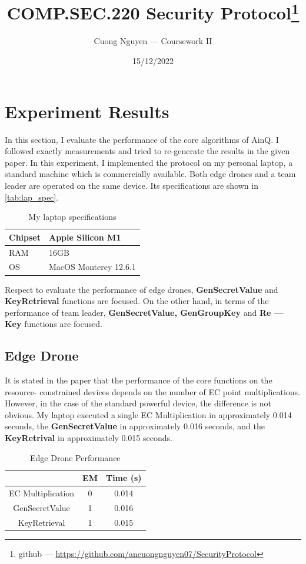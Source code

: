 \documentclass{article}
\title{COMP.SEC.220 Security Protocol\footnote{github --- \url{https://github.com/ancuongnguyen07/SecurityProtocol}}}
\author{Cuong Nguyen --- Coursework II}
\date{15/12/2022}
\begin{document}
    
\maketitle

\section{Experiment Results}
%
In this section, I evaluate the performance of the core algorithms of AinQ. I followed
exactly measurements and tried to re-generate the results in the given paper\cite{ainQ}.
In this experiment, I implemented the protocol on my personal laptop, a standard
machine which is commercially available. Both edge drones and a team leader
are operated on the same device.
Its specifications are shown in \autoref{tab:lap_spec}.

\begin{table}
    \centering
    \begin{tabular}{|l|l|}
        \hline
        Chipset & Apple Silicon M1 \\ \hline
        RAM & 16GB \\ \hline
        OS & MacOS Monterey 12.6.1 \\ \hline
    \end{tabular}
    \caption{My laptop specifications}\label{tab:lap_spec}
\end{table}

Respect to evaluate the performance of edge drones, \textbf{GenSecretValue} and
\textbf{KeyRetrieval} functions are focused. On the other hand, in terms of the performance
of team leader, \textbf{GenSecretValue, GenGroupKey} and \textbf{Re --- Key} functions
are focused.

\subsection{Edge Drone}
%
It is stated in the paper that the performance of the core functions on the resource-
constrained devices depends on the number of EC point multiplications\cite{ainQ}.
However, in the case of the standard powerful device, the difference is not obvious.
My laptop executed a single EC Multiplication in approximately 0.014 seconds, the
\textbf{GenSecretValue} in approximately 0.016 seconds, and the \textbf{KeyRetrival}
in approximately 0.015 seconds.

\begin{table}
    \centering
    \begin{tabular}{|c|c|c|}
        \hline
         & EM & Time (s) \\ \hline
        EC Multiplication & 0 & 0.014 \\ \hline
        GenSecretValue & 1 & 0.016 \\ \hline
        KeyRetrieval & 1 & 0.015 \\ \hline
    \end{tabular}
    \caption{Edge Drone Performance}\label{tab:edge_drone}
\end{table}
\end{document}
